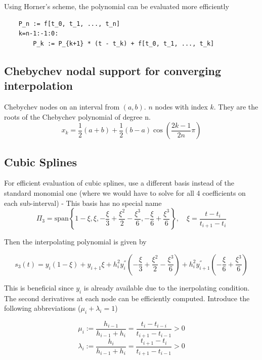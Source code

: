 \documentclass[
    a4paper,
    11pt
]{article}
\begin{document}
Using Horner's scheme, the polynomial can be evaluated more efficiently
\begin{verbatim}
    P_n := f[t_0, t_1, ..., t_n]
    k=n-1:-1:0:
        P_k := P_{k+1} * (t - t_k) + f[t_0, t_1, ..., t_k]
\end{verbatim}



\subsection{Chebychev nodal support for converging interpolation}

Chebychev nodes on an interval from $(a,b)$. $n$ nodes with index $k$. They are
the roots of the Chebychev polynomial of degree n.
\begin{equation}
    x_k = \frac{1}{2}(a+b) + \frac{1}{2}(b-a)\cos(\frac{2k-1}{2n}\pi)
\end{equation}

\subsection{Cubic Splines}

For efficient evaluation of cubic splines, use a different basis instead of the
standard monomial one (where we would have to solve for all 4 coefficients on
each sub-interval) - This basis has no special name
\begin{equation}
    \Pi_3 = \text{span}\left\{
        1 - \xi,
        \xi,
        -\frac{\xi}{3}+\frac{\xi^2}{2}-\frac{\xi^3}{6},
        -\frac{\xi}{6} + \frac{\xi^3}{6}
    \right\}, \quad \xi = \frac{t-t_i}{t_{i+1} - t_i}
\end{equation}

Then the interpolating polynomial is given by

\begin{equation}
    s_3(t) = y_i(1-\xi) + y_{i+1}\xi + h_i^2 y_i^{''} \left( -\frac{\xi}{3} +
    \frac{\xi^2}{2} - \frac{\xi^3}{6} \right) + h_i^2 y_{i+1}^{''} \left(
    -\frac{\xi}{6} + \frac{\xi^3}{6} \right)
\end{equation}

This is beneficial since $y_i$ is already available due to the inerpolating
condition. The second derivatives at each node can be efficiently computed.
Introduce the following abbreviations ($\mu_i + \lambda_i =1$)

\begin{equation}
    \mu_i := \frac{h_{i-1}}{h_{i-1} + h_i} = \frac{t_i -t_{i-i}}{t_{i+1} -
    t_{i-1}} > 0
\end{equation}
\begin{equation}
    \lambda_i := \frac{h_i}{h_{i-1} + h_i} = \frac{t_{i+1} - t_i}{t_{i+1} -
    t_{i-1}} > 0
\end{equation}
\end{document}

